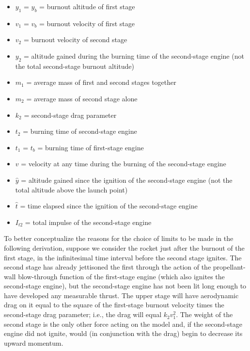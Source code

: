 \begin{itemize}[nosep,leftmargin=2.5em,label={}]
  \item $y_1$ = $y_b$ = burnout altitude of first stage
  \item $v_1$ = $v_b$ = burnout velocity of first stage
  \item $v_2$ = burnout velocity of second stage
  \item $y_2$ = altitude gained during the burning time of the second-stage engine (not the total
  second-stage burnout altitude)
  \item $m_1$ = average mass of first and second stages together
  \item $m_2$ = average mass of second stage alone
  \item $k_2$ = second-stage drag parameter
  \item $t_2$ = burning time of second-stage engine
  \item $t_1$ = $t_b$ = burning time of first-stage engine
  \item $v$ = velocity at any time during the burning of the second-stage engine
  \item $\hat{y}$ = altitude gained since the ignition of the second-stage engine (not the total
  altitude above the launch point)
  \item $\hat{t}$ = time elapsed since the ignition of the second-stage engine
  \item $I_{t2}$ = total impulse of the second-stage engine
\end{itemize}

To better conceptualize the reasons for the choice of limits to be made in the following
derivation, suppose we consider the rocket just after the burnout of the first stage, in the
infinitesimal time interval before the second stage ignites. The second stage has already
jettisoned the first through the action of the propellant-wall blow-through function of the
first-stage engine (which also ignites the second-stage engine), but the second-stage engine has
not been lit long enough to have developed any measurable thrust. The upper stage will have
aerodynamic drag on it equal to the square of the first-stage burnout velocity times the
second-stage drag parameter; i.e., the drag will equal $k_2v_1^{2}$. The weight of the second stage
is the only other force acting on the model and, if the second-stage engine did not ignite, would
(in conjunction with the drag) begin to decrease its upward momentum.

